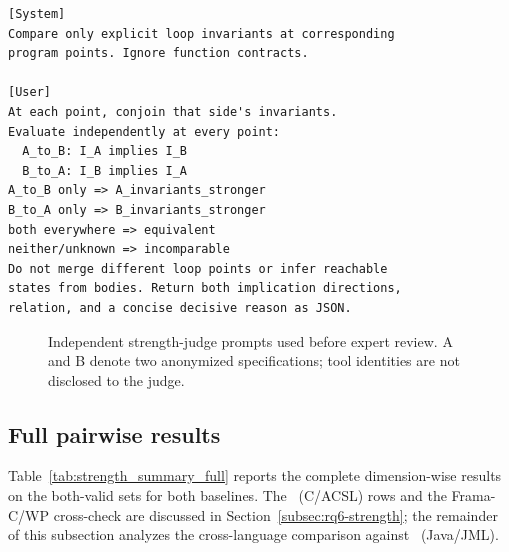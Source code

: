\begin{minipage}[t]{\columnwidth}
\begin{tcolorbox}[promptboxcompact, title={\textcolor{white}{Loop-invariant judge}}, width=\linewidth]
\begin{lstlisting}[style=PromptInnerCompact]
[System]
Compare only explicit loop invariants at corresponding
program points. Ignore function contracts.

[User]
At each point, conjoin that side's invariants.
Evaluate independently at every point:
  A_to_B: I_A implies I_B
  B_to_A: I_B implies I_A
A_to_B only => A_invariants_stronger
B_to_A only => B_invariants_stronger
both everywhere => equivalent
neither/unknown => incomparable
Do not merge different loop points or infer reachable
states from bodies. Return both implication directions,
relation, and a concise decisive reason as JSON.
\end{lstlisting}
\end{tcolorbox}
\end{minipage}
\begin{figure}[H]
\caption{{Independent strength-judge prompts used before expert review. A and B denote two anonymized specifications; tool identities are not disclosed to the judge.}}
\label{fig:prompt-judge}
\end{figure}

\subsection{{Full pairwise results}}
\label{app:strength-results}

{Table~\ref{tab:strength_summary_full} reports the complete dimension-wise results on the both-valid sets for both baselines. The \autospec\ (C/ACSL) rows and the Frama-C/WP cross-check are discussed in Section~\ref{subsec:rq6-strength}; the remainder of this subsection analyzes the cross-language comparison against \specgen\ (Java/JML).}

